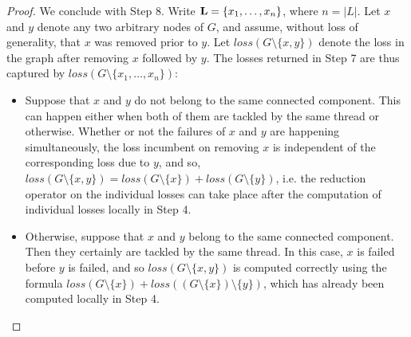 \begin{proof}
We conclude with Step 8. Write ${\bf L} = \{x_1,\ldots,x_n\}$, where $n = \left \vert L \right \vert$. Let $x$ and $y$ denote any two arbitrary nodes of $G$, and assume, without loss of generality, that $x$ was removed prior to $y$. Let $loss(G\setminus \{x,y\})$ denote the loss in the graph after removing $x$ followed by $y$. The losses returned in Step 7 are thus captured by $loss(G\setminus \{x_1,\ldots,x_n\})$:
\begin{itemize}
\item{Suppose that $x$ and $y$ do not belong to the same connected component. This can happen either when both of them are tackled by the same thread or otherwise. Whether or not the failures of $x$ and $y$ are happening simultaneously, the loss incumbent on removing $x$ is independent of the corresponding loss due to $y$, and so, $loss(G\setminus \{x,y\}) = loss (G \setminus \{x\}) + loss (G \setminus \{y\})$, i.e. the reduction operator on the individual losses can take place after the computation of individual losses locally in Step 4.}
\item{Otherwise, suppose that $x$ and $y$ belong to the same connected component. Then they certainly are tackled by the same thread. In this case, $x$ is failed before $y$ is failed, and so $loss(G\setminus \{x,y\})$ is computed correctly using the formula $loss(G \setminus \{x\}) + loss \left (\left(G \setminus \{x\}\right)\setminus \{y\}\right)$, which has already been computed locally in Step 4.} 
\end{itemize}
\end{proof}



